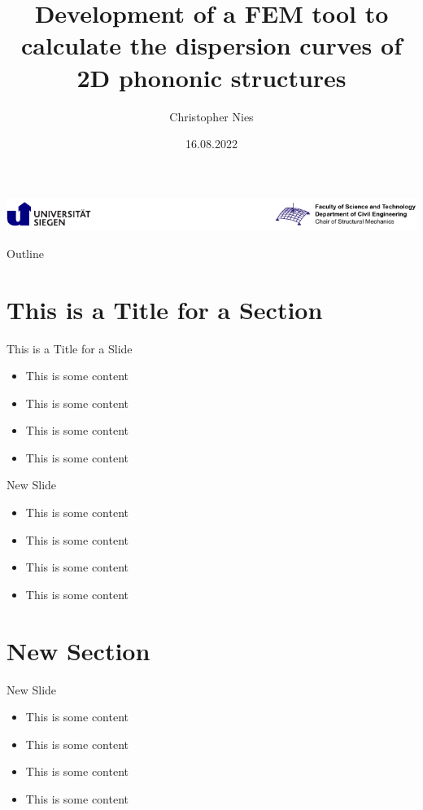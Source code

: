 \documentclass[
]{beamer}
\title[FEM tool to calculate dispersion curves]{
	Development of a FEM tool to calculate the dispersion curves of 2D phononic structures 
}
\author{Christopher Nies}
\institute{Chair of Structural Mechanics}
\date{16.08.2022}
\begin{document}
\begin{frame}
	\centering\includegraphics[width=\textwidth]{uni-baustatik-logo.pdf}\\
	\titlepage
\end{frame}

\begin{frame}{Outline}
	\tableofcontents
\end{frame}

\section{This is a Title for a Section}

\begin{frame}{This is a Title for a Slide}

	\begin{itemize}
		\item This is some content
		\item This is some content
		\item This is some content
		\item This is some content
	\end{itemize}

\end{frame}

\begin{frame}{New Slide}

\begin{itemize}
	\item This is some content
	\item This is some content
	\item This is some content
	\item This is some content
\end{itemize}

\end{frame}


\section{New Section}

\begin{frame}{New Slide}

\begin{itemize}
	\item This is some content
	\item This is some content
	\item This is some content
	\item This is some content
\end{itemize}

\end{frame}
\end{document}
